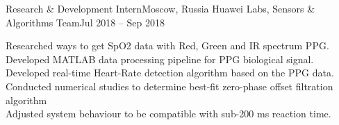 \resumeSubheading
  {Research \& Development Intern}{Moscow, Russia}
  {Huawei Labs, Sensors \& Algorithms Team}{Jul 2018 -- Sep 2018}
  \begin{itemize}[leftmargin=0in, label={}]
    \small{\item{
      {Researched ways to get SpO2 data with Red, Green and IR spectrum PPG.}\\
      {Developed MATLAB data processing pipeline for PPG biological signal.}\\
      {Developed real-time Heart-Rate detection algorithm based on the PPG data.}\\
      {Conducted numerical studies to determine best-fit zero-phase offset filtration algorithm}\\
      {Adjusted system behaviour to be compatible with sub-200 ms reaction time. }\\
    }}
  \end{itemize}